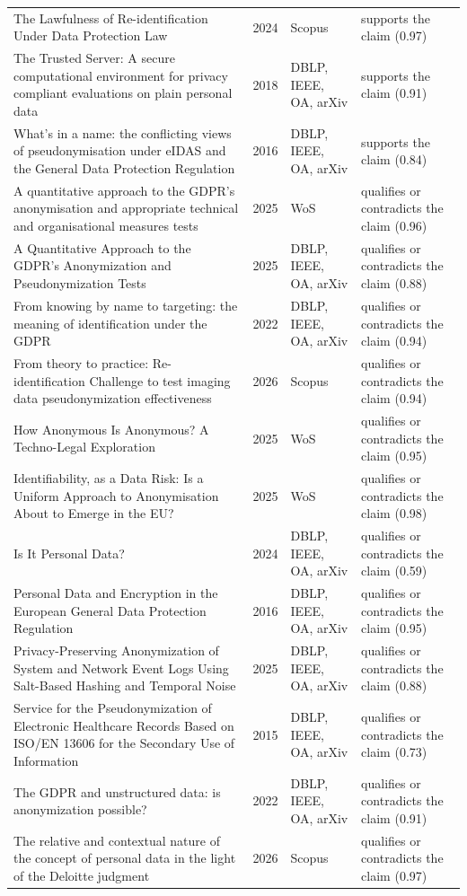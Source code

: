 \begin{longtable}{@{}%
  >{\raggedright\arraybackslash}p{}c%
  >{\raggedright\arraybackslash}p{}%
  >{\raggedright\arraybackslash}p{}@{}}
The Lawfulness of Re-identification Under Data Protection Law & 2024 & Scopus & supports the claim (0.97) \\
The Trusted Server: A secure computational environment for privacy compliant evaluations on plain personal data & 2018 & DBLP, IEEE, OA, arXiv & supports the claim (0.91) \\
What's in a name: the conflicting views of pseudonymisation under eIDAS and the General Data Protection Regulation & 2016 & DBLP, IEEE, OA, arXiv & supports the claim (0.84) \\
A quantitative approach to the GDPR's anonymisation and \textquotedbl{}appropriate technical and organisational measures\textquotedbl{} tests & 2025 & WoS & qualifies or contradicts the claim (0.96) \\
A Quantitative Approach to the GDPR's Anonymization and Pseudonymization Tests & 2025 & DBLP, IEEE, OA, arXiv & qualifies or contradicts the claim (0.88) \\
From knowing by name to targeting: the meaning of identification under the GDPR & 2022 & DBLP, IEEE, OA, arXiv & qualifies or contradicts the claim (0.94) \\
From theory to practice: Re-identification Challenge to test imaging data pseudonymization effectiveness & 2026 & Scopus & qualifies or contradicts the claim (0.94) \\
How Anonymous Is Anonymous? A Techno-Legal Exploration & 2025 & WoS & qualifies or contradicts the claim (0.95) \\
Identifiability, as a Data Risk: Is a Uniform Approach to Anonymisation About to Emerge in the EU? & 2025 & WoS & qualifies or contradicts the claim (0.98) \\
Is It Personal Data? & 2024 & DBLP, IEEE, OA, arXiv & qualifies or contradicts the claim (0.59) \\
Personal Data and Encryption in the European General Data Protection Regulation & 2016 & DBLP, IEEE, OA, arXiv & qualifies or contradicts the claim (0.95) \\
Privacy-Preserving Anonymization of System and Network Event Logs Using Salt-Based Hashing and Temporal Noise & 2025 & DBLP, IEEE, OA, arXiv & qualifies or contradicts the claim (0.88) \\
Service for the Pseudonymization of Electronic Healthcare Records Based on ISO/EN 13606 for the Secondary Use of Information & 2015 & DBLP, IEEE, OA, arXiv & qualifies or contradicts the claim (0.73) \\
The GDPR and unstructured data: is anonymization possible? & 2022 & DBLP, IEEE, OA, arXiv & qualifies or contradicts the claim (0.91) \\
The relative and contextual nature of the concept of personal data in the light of the Deloitte judgment & 2026 & Scopus & qualifies or contradicts the claim (0.97) \\
\end{longtable}
\endgroup
